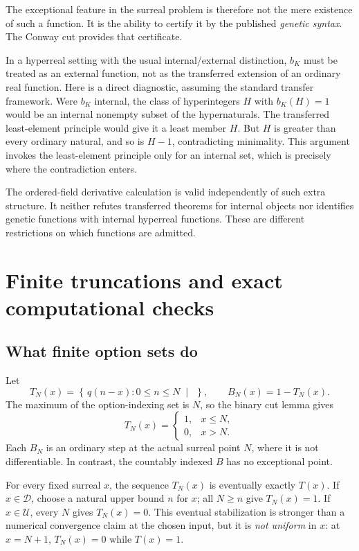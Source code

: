 \documentclass[11pt,letterpaper]{article}
\numberwithin{equation}{section}
\theoremstyle{definition}
\theoremstyle{remark}
\newcommand{\U}{\mathcal{U}}
\newcommand{\D}{\mathcal{D}}
\newcommand{\cut}[2]{\left\{\,#1\;\middle|\;#2\,\right\}}
\begin{document}
The exceptional feature in the surreal problem is therefore not the mere
existence of such a function. It is the ability to certify it by the
published \emph{genetic syntax}. The Conway cut provides that certificate.

In a hyperreal setting with the usual internal/external distinction,
$b_K$ must be treated as an external function, not as the transferred
extension of an ordinary real function. Here is a direct diagnostic,
assuming the standard transfer framework. Were $b_K$ internal, the class
of hyperintegers $H$ with $b_K(H)=1$ would be an internal nonempty subset
of the hypernaturals. The transferred least-element principle would give
it a least member $H$. But $H$ is greater than every ordinary natural, and
so is $H-1$, contradicting minimality. This argument invokes the
least-element principle only for an internal set, which is precisely
where the contradiction enters.

The ordered-field derivative calculation is valid independently of such
extra structure. It neither refutes transferred theorems for internal
objects nor identifies genetic functions with internal hyperreal
functions. These are different restrictions on which functions are
admitted.

\section{Finite truncations and exact computational checks}\label{sec:checks}
\subsection{What finite option sets do}
Let
\[
 T_N(x)=\cut{q(n-x):0\le n\le N}{},\qquad B_N(x)=1-T_N(x).
\]
The maximum of the option-indexing set is $N$, so the binary cut lemma gives
\[
 T_N(x)=\begin{cases}1,&x\le N,\\0,&x>N.\end{cases}
\]
Each $B_N$ is an ordinary step at the actual surreal point $N$, where it
is not differentiable. In contrast, the countably indexed $B$ has no
exceptional point.

For every fixed surreal $x$, the sequence $T_N(x)$ is eventually exactly
$T(x)$. If $x\in\D$, choose a natural upper bound $n$ for $x$; all
$N\ge n$ give $T_N(x)=1$. If $x\in\U$, every $N$ gives $T_N(x)=0$.
This eventual stabilization is stronger than a numerical convergence
claim at the chosen input, but it is \emph{not uniform} in $x$: at
$x=N+1$, $T_N(x)=0$ while $T(x)=1$.
\end{document}
